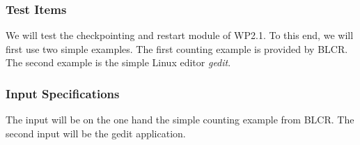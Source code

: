 




\subsubsection{Test Items}
We will test the checkpointing and restart module of WP2.1. To this end, we will first use two simple examples. The first counting example is provided by BLCR. The second example is the simple Linux editor \emph{gedit}.

\subsubsection{Input Specifications}
The input will be on the one hand the simple counting example from BLCR. The second input will be the gedit application.

